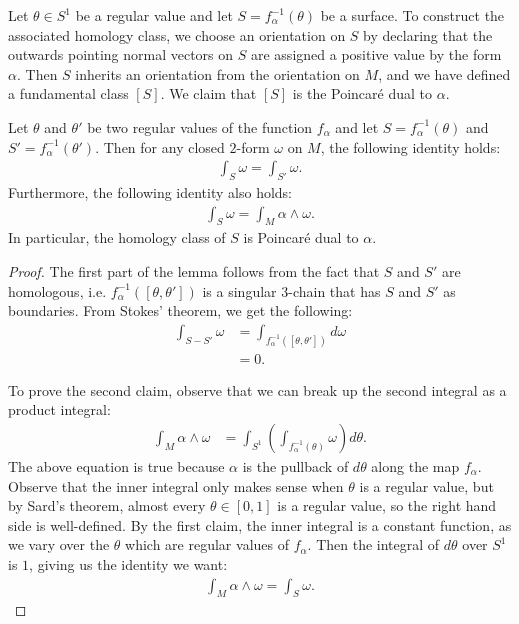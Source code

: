 Let $\theta \in S^1$ be a regular value and let $S = f_{\alpha}^{-1}(\theta)$ be a surface.
To construct the associated homology class, we choose an orientation on $S$ by declaring that the outwards pointing normal vectors on $S$ are assigned a positive value by the form $\alpha$.
Then $S$ inherits an orientation from the orientation on $M$, and we have defined a
fundamental class $[S]$.
We claim that $[S]$ is the Poincar\'e dual to $\alpha$.
\begin{lem}
  Let $\theta$ and $\theta'$ be two regular values of the function $f_{\alpha}$ and let $S=f_\alpha^{-1}(\theta)$ and $S'=f_\alpha^{-1}(\theta')$.
  Then for any closed $2$-form $\omega$ on $M$, the following identity holds:
  \begin{align*}
    \int_{S} \omega = \int_{S'} \omega.
  \end{align*}
  Furthermore, the following identity also holds:
  \begin{align*}
    \int_S \omega = \int_M \alpha \wedge \omega.
  \end{align*}
  In particular, the homology class of $S$ is Poincar\'e dual to $\alpha$.
\end{lem}
\begin{proof}
  The first part of the lemma follows from the fact that $S$ and $S'$ are homologous, i.e. $f^{-1}_{\alpha}([\theta, \theta'])$ is a singular $3$-chain that has $S$ and $S'$ as boundaries.
  From Stokes' theorem, we get the following:
  \begin{align*}
    \int_{S - S'} \omega &= \int_{f_{\alpha}^{-1}([\theta, \theta'])} d\omega \\
                         &= 0.
  \end{align*}

  To prove the second claim, observe that we can break up the second integral as a product integral:
  \begin{align*}
    \int_M \alpha \wedge \omega &= \int_{S^1} \left(   \int_{f_{\alpha}^{-1}(\theta)} \omega \right) d\theta.
  \end{align*}
  The above equation is true because $\alpha$ is the pullback of $d\theta$ along the map $f_{\alpha}$.
  Observe that the inner integral only makes sense when $\theta$ is a regular value, but by Sard's theorem, almost every $\theta \in [0,1]$ is a regular value, so the right hand side is well-defined.
  By the first claim, the inner integral is a constant function, as we vary over the $\theta$ which are regular values of $f_{\alpha}$.
  Then the integral of $d\theta$ over $S^1$ is $1$, giving us the identity we want:
  \begin{align*}
    \int_M \alpha \wedge \omega = \int_S \omega.
  \end{align*}
\end{proof}
